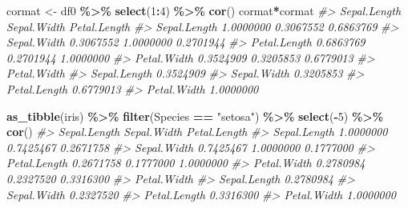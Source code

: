 \documentclass[
  xelatex, ja=standard]{bxjsbook}
\newenvironment{Shaded}{\begin{snugshade}}{\end{snugshade}}
\newcommand{\CommentTok}[1]{\textcolor[rgb]{0.56,0.35,0.01}{\textit{#1}}}
\newcommand{\DecValTok}[1]{\textcolor[rgb]{0.00,0.00,0.81}{#1}}
\newcommand{\FunctionTok}[1]{\textcolor[rgb]{0.13,0.29,0.53}{\textbf{#1}}}
\newcommand{\NormalTok}[1]{#1}
\newcommand{\OtherTok}[1]{\textcolor[rgb]{0.56,0.35,0.01}{#1}}
\newcommand{\SpecialCharTok}[1]{\textcolor[rgb]{0.81,0.36,0.00}{\textbf{#1}}}
\newcommand{\StringTok}[1]{\textcolor[rgb]{0.31,0.60,0.02}{#1}}
\theoremstyle{definition}
\theoremstyle{definition}
\theoremstyle{definition}
\theoremstyle{definition}
\theoremstyle{remark}
\begin{document}
\begin{Shaded}
\begin{Highlighting}[]
\NormalTok{cormat }\OtherTok{\textless{}{-}}\NormalTok{ df0 }\SpecialCharTok{\%\textgreater{}\%} \FunctionTok{select}\NormalTok{(}\DecValTok{1}\SpecialCharTok{:}\DecValTok{4}\NormalTok{) }\SpecialCharTok{\%\textgreater{}\%} \FunctionTok{cor}\NormalTok{()}
\NormalTok{cormat}\SpecialCharTok{*}\NormalTok{cormat}
\CommentTok{\#\textgreater{}              Sepal.Length Sepal.Width Petal.Length}
\CommentTok{\#\textgreater{} Sepal.Length    1.0000000   0.3067552    0.6863769}
\CommentTok{\#\textgreater{} Sepal.Width     0.3067552   1.0000000    0.2701944}
\CommentTok{\#\textgreater{} Petal.Length    0.6863769   0.2701944    1.0000000}
\CommentTok{\#\textgreater{} Petal.Width     0.3524909   0.3205853    0.6779013}
\CommentTok{\#\textgreater{}              Petal.Width}
\CommentTok{\#\textgreater{} Sepal.Length   0.3524909}
\CommentTok{\#\textgreater{} Sepal.Width    0.3205853}
\CommentTok{\#\textgreater{} Petal.Length   0.6779013}
\CommentTok{\#\textgreater{} Petal.Width    1.0000000}
\end{Highlighting}
\end{Shaded}

\begin{Shaded}
\begin{Highlighting}[]
\FunctionTok{as\_tibble}\NormalTok{(iris) }\SpecialCharTok{\%\textgreater{}\%} \FunctionTok{filter}\NormalTok{(Species }\SpecialCharTok{==} \StringTok{"setosa"}\NormalTok{) }\SpecialCharTok{\%\textgreater{}\%} \FunctionTok{select}\NormalTok{(}\SpecialCharTok{{-}}\DecValTok{5}\NormalTok{) }\SpecialCharTok{\%\textgreater{}\%} \FunctionTok{cor}\NormalTok{()}
\CommentTok{\#\textgreater{}              Sepal.Length Sepal.Width Petal.Length}
\CommentTok{\#\textgreater{} Sepal.Length    1.0000000   0.7425467    0.2671758}
\CommentTok{\#\textgreater{} Sepal.Width     0.7425467   1.0000000    0.1777000}
\CommentTok{\#\textgreater{} Petal.Length    0.2671758   0.1777000    1.0000000}
\CommentTok{\#\textgreater{} Petal.Width     0.2780984   0.2327520    0.3316300}
\CommentTok{\#\textgreater{}              Petal.Width}
\CommentTok{\#\textgreater{} Sepal.Length   0.2780984}
\CommentTok{\#\textgreater{} Sepal.Width    0.2327520}
\CommentTok{\#\textgreater{} Petal.Length   0.3316300}
\CommentTok{\#\textgreater{} Petal.Width    1.0000000}
\end{Highlighting}
\end{Shaded}
\end{document}
